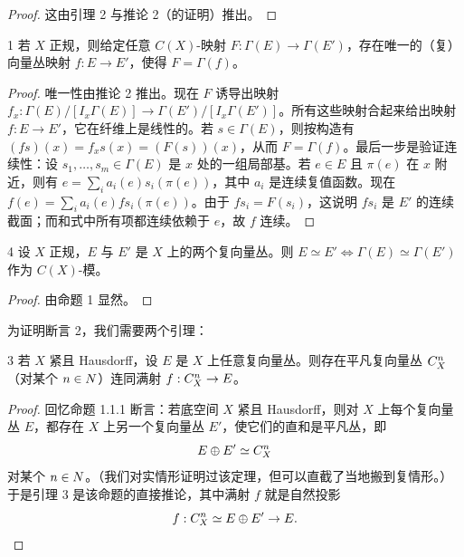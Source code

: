\begin{proof} 这由引理 2 与推论 2（的证明）推出。\end{proof}

\begin{prop}{1} 若 $X$ 正规，则给定任意 $C(X)$-映射 $F : \Gamma(E) \to \Gamma(E')$，存在唯一的（复）向量丛映射 $f : E \to E'$，使得 $F = \Gamma(f)$。\end{prop}

\begin{proof} 唯一性由推论 2 推出。现在 $F$ 诱导出映射 $f_x : \Gamma(E)/[I_x\Gamma(E)] \to \Gamma(E')/[I_x\Gamma(E')]$。所有这些映射合起来给出映射 $f : E \to E'$，它在纤维上是线性的。若 $s \in \Gamma(E)$，则按构造有 $(fs)(x) = f_x s(x) = (F(s))(x)$，从而 $F = \Gamma(f)$。最后一步是验证连续性：设 $s_1, \dots, s_m \in \Gamma(E)$ 是 $x$ 处的一组局部基。若 $e \in E$ 且 $\pi(e)$ 在 $x$ 附近，则有 $e = \sum_i a_i(e)s_i(\pi(e))$，其中 $a_i$ 是连续复值函数。现在 $f(e) = \sum_i a_i(e)fs_i(\pi(e))$。由于 $fs_i = F(s_i)$，这说明 $fs_i$ 是 $E'$ 的连续截面；而和式中所有项都连续依赖于 $e$，故 $f$ 连续。\end{proof}

\begin{cor}{4} 设 $X$ 正规，$E$ 与 $E'$ 是 $X$ 上的两个复向量丛。则 $E \simeq E' \iff \Gamma(E) \simeq \Gamma(E')$ 作为 $C(X)$-模。\end{cor}

\begin{proof} 由命题 1 显然。\end{proof}

为证明断言 2，我们需要两个引理：

\begin{lem}{3} 若 $X$ 紧且 Hausdorff，设 $E$ 是 $X$ 上任意复向量丛。则存在平凡复向量丛 $C^n_X$（对某个 $n \in N$）连同满射 $f : C^n_X \to E$。\end{lem}

\begin{proof} 回忆命题 1.1.1 断言：若底空间 $X$ 紧且 Hausdorff，则对 $X$ 上每个复向量丛 $E$，都存在 $X$ 上另一个复向量丛 $E'$，使它们的直和是平凡丛，即
\[ E \oplus E' \simeq C^n_X \]
对某个 $n \in N$。（我们对实情形证明过该定理，但可以直截了当地搬到复情形。）于是引理 3 是该命题的直接推论，其中满射 $f$ 就是自然投影
\[ f : C^n_X \simeq E \oplus E' \to E. \]
\end{proof}

